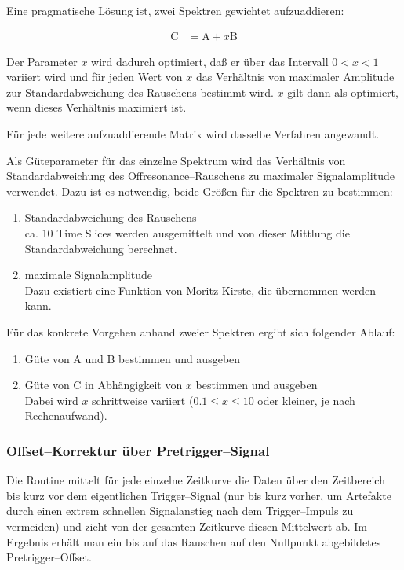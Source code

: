 \documentclass{article}
\newcommand{\vect}[1]{\boldsymbol{\mathrm #1}}
\begin{document}
Eine pragmatische Lösung ist, zwei Spektren gewichtet aufzuaddieren:

\begin{align*}
	\vect{C} &= \vect{A} + x \vect{B}
\end{align*}

Der Parameter $x$ wird dadurch optimiert, daß er über das Intervall $0 < x < 1$ 
variiert wird und für jeden Wert von $x$ das Verhältnis von maximaler Amplitude 
zur Standardabweichung des Rauschens bestimmt wird. $x$ gilt dann als 
optimiert, wenn dieses Verhältnis maximiert ist.

Für jede weitere aufzuaddierende Matrix wird dasselbe Verfahren angewandt.

Als Güteparameter für das einzelne Spektrum wird das Verhältnis von
Standardabweichung des Offresonance--Rauschens zu maximaler Signalamplitude
verwendet. Dazu ist es notwendig, beide Größen für die Spektren zu bestimmen:

\begin{enumerate}
  \item Standardabweichung des Rauschens\\
  ca. 10 Time Slices werden ausgemittelt und von dieser Mittlung die
  Standardabweichung berechnet.
  \item maximale Signalamplitude\\
  Dazu existiert eine Funktion von Moritz Kirste, die übernommen werden kann.
\end{enumerate}

Für das konkrete Vorgehen anhand zweier Spektren ergibt sich folgender Ablauf:

\begin{enumerate}
  \item Güte von $\vect{A}$ und $\vect{B}$ bestimmen und ausgeben
  \item Güte von $\vect{C}$ in Abhängigkeit von $x$ bestimmen und ausgeben\\
  Dabei wird $x$ schrittweise variiert ($0.1\leq x\leq 10$ oder kleiner, je nach
  Rechenaufwand).
\end{enumerate}


\subsubsection{Offset--Korrektur über Pretrigger--Signal}

Die Routine mittelt für jede einzelne Zeitkurve die Daten über den Zeitbereich 
bis kurz vor dem eigentlichen Trigger--Signal (nur bis kurz vorher, um 
Artefakte durch einen extrem schnellen Signalanstieg nach dem Trigger--Impuls 
zu vermeiden) und zieht von der gesamten Zeitkurve diesen Mittelwert ab. Im 
Ergebnis erhält man ein bis auf das Rauschen auf den Nullpunkt abgebildetes 
Pretrigger--Offset.
\end{document}

